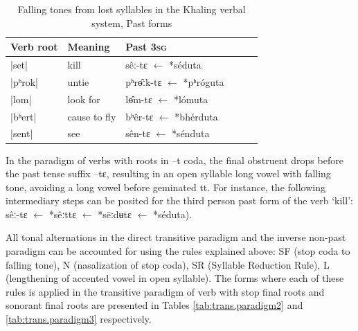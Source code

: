 \documentclass[oldfontcommands,oneside,a4paper,11pt]{article}
\newcommand{\ipa}[1]{{\phon \mbox{#1}}} %
\begin{document}
 
\begin{table}[H] 
\caption{Falling tones from lost syllables in the Khaling verbal system, Past forms} \centering  \label{tab:falling.verb3} 
\begin{tabular}{llllll} 
\toprule 
Verb root	&Meaning	& Past \textsc{3sg} \\ 
\midrule 
|set|	&	kill			&\ipa{sêː-tɛ} $\leftarrow$ \ipa{*séduta}  \\ 
|pʰrok|	&	untie		&\ipa{pʰrɵ̂ːk-tɛ} $\leftarrow$ \ipa{*pʰróguta} \\
|lom|	&	look for		&\ipa{lɵ̂m-tɛ} $\leftarrow$ \ipa{*lómuta}  \\ 
\midrule
|bʰert|	&	cause to fly			&\ipa{bʰêr-tɛ} $\leftarrow$ \ipa{*bhérduta} \\ 
|sent|	&	see			&\ipa{sên-tɛ} $\leftarrow$ \ipa{*sénduta}  \\ 
\bottomrule 
\end{tabular} 
\end{table} 

In the paradigm of verbs with roots in \ipa{--t} coda, the final obstruent drops before the past tense suffix \ipa{--tɛ}, resulting in an open syllable long vowel with falling tone, avoiding a long vowel before geminated \ipa{tt}. For instance, the following intermediary steps can be posited for the third person past form of the verb `kill': \ipa{sêː-tɛ}   $\leftarrow$ \ipa{*sêːttɛ}  $\leftarrow$ \ipa{*sēːdʉtɛ}  $\leftarrow$ \ipa{*séduta}).



All tonal alternations in the direct transitive paradigm and the inverse non-past paradigm can be accounted for using the rules explained above: SF (stop coda to falling tone), N (nasalization of stop coda), SR (Syllable Reduction Rule), L (lengthening of accented vowel in open syllable). The forms where each of these rules is applied in the transitive paradigm of verb with stop final roots and sonorant final roots are presented   in Tables \ref{tab:trans.paradigm2} and \ref{tab:trans.paradigm3} respectively.
\end{document}
